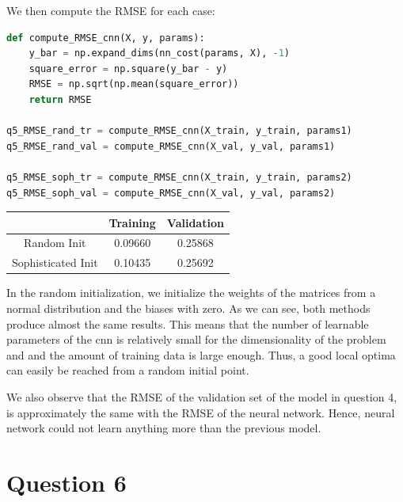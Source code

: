 \documentclass{article}
\begin{document}
We then compute the RMSE for each case:

\begin{lstlisting}[language=Python]
def compute_RMSE_cnn(X, y, params):
    y_bar = np.expand_dims(nn_cost(params, X), -1)
    square_error = np.square(y_bar - y)
    RMSE = np.sqrt(np.mean(square_error))
    return RMSE

q5_RMSE_rand_tr = compute_RMSE_cnn(X_train, y_train, params1)
q5_RMSE_rand_val = compute_RMSE_cnn(X_val, y_val, params1)

q5_RMSE_soph_tr = compute_RMSE_cnn(X_train, y_train, params2)
q5_RMSE_soph_val = compute_RMSE_cnn(X_val, y_val, params2)
\end{lstlisting}

\begin{center}
\begin{tabular}{ | c | c | c | }
\hline
 & Training & Validation \\
\hline
Random Init & 0.09660 & 0.25868 \\ 
\hline
Sophisticated Init & 0.10435 & 0.25692 \\ 
\hline
\end{tabular}
\end{center}

In the random initialization, we initialize the weights of the matrices from a normal distribution and the biases with zero.
As we can see, both methods produce almost the same results. This means that the number of learnable parameters of the cnn is relatively small for the dimensionality of the problem and and the amount of training data is large enough. Thus, a good local optima can easily be reached from a random initial point.

We also observe that the RMSE of the validation set of the model in question 4, is approximately the same with the RMSE of the neural network. Hence, neural network could not learn anything more than the previous model. 

\section*{Question 6}
\end{document}
